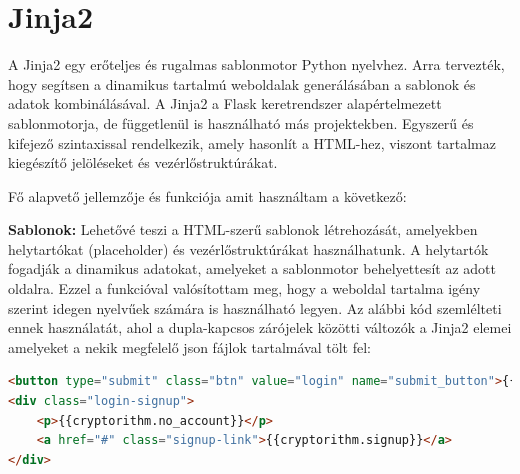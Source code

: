 \section {Jinja2}
\label{sec:jinja2}
A Jinja2 egy erőteljes és rugalmas sablonmotor Python nyelvhez. Arra tervezték, hogy segítsen a dinamikus tartalmú weboldalak generálásában a sablonok és adatok kombinálásával. A Jinja2 a Flask keretrendszer alapértelmezett sablonmotorja, de függetlenül is használható más projektekben. Egyszerű és kifejező szintaxissal rendelkezik, amely hasonlít a HTML-hez, viszont tartalmaz kiegészítő jelöléseket és vezérlőstruktúrákat.

Fő alapvető jellemzője és funkciója amit használtam a következő:

 	 \textbf{Sablonok:}
Lehetővé teszi a HTML-szerű sablonok létrehozását, amelyekben helytartókat (placeholder) és vezérlőstruktúrákat használhatunk. A helytartók fogadják a dinamikus adatokat, amelyeket a sablonmotor behelyettesít az adott oldalra. Ezzel a funkcióval valósítottam meg, hogy a weboldal tartalma igény szerint idegen nyelvűek számára is használható legyen.
Az alábbi kód szemlélteti ennek használatát, ahol a dupla-kapcsos zárójelek közötti változók a Jinja2 elemei amelyeket a nekik megfelelő json fájlok tartalmával tölt fel:
\begin{lstlisting}[caption={Jinja2 sablon kódrészlet}, captionpos=b,  language = HTML]
<button type="submit" class="btn" value="login" name="submit_button">{{cryptorithm.login}}</button>
<div class="login-signup">
	<p>{{cryptorithm.no_account}}</p>
	<a href="#" class="signup-link">{{cryptorithm.signup}}</a>
</div>
\end{lstlisting}
